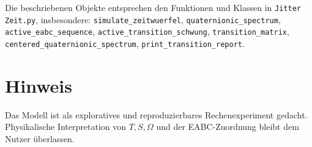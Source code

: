\documentclass[11pt,a4paper]{article}
\begin{document}
Die beschriebenen Objekte entsprechen den Funktionen und Klassen in
\texttt{Jitter Zeit.py}, insbesondere:
\texttt{simulate\_zeitwuerfel},
\texttt{quaternionic\_spectrum},
\texttt{active\_eabc\_sequence},
\texttt{active\_transition\_schwung},
\texttt{transition\_matrix},
\texttt{centered\_quaternionic\_spectrum},
\texttt{print\_transition\_report}.

\section*{Hinweis}

Das Modell ist als exploratives und reproduzierbares Rechenexperiment gedacht.
Physikalische Interpretation von $T,S,\Omega$ und der EABC-Zuordnung bleibt dem Nutzer
überlassen.
\end{document}

